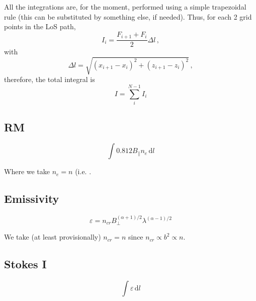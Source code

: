 \documentclass[a4paper,10pt]{article}
\newcommand{\dd}{\mathrm{d}}  %
\begin{document}
All the integrations are, for the moment, performed using a simple trapezoidal rule
(this can be substituted by something else, if needed).
Thus, for each 2 grid points in the LoS path,
\[
 I_i = \frac{F_{i+1}+F_{i}}{2} \Delta l\,,
\]
with
\[
    \Delta l = \sqrt{ (x_{i+1}-x_i)^2 + (z_{i+1}-z_i)^2}\,,
\]
therefore, the total integral is
\[
 I = \sum_{i}^{N-1} I_i
\]




\subsection{RM}
\[
    \int 0.812 B_\parallel n_e \,\dd l
\]

Where we take $n_e=n$ (i.e. .
\subsection{Emissivity}

\[
 \varepsilon = n_{cr} B_\perp^{(\alpha+1)/2}\lambda^{(\alpha-1)/2}
\]

We take (at least provisionally) $n_{cr} = n$ since $n_{cr}\propto b^2 \propto n$.

\subsection{Stokes I}
\[
    \int \varepsilon  \,\dd l
\]
\end{document}
